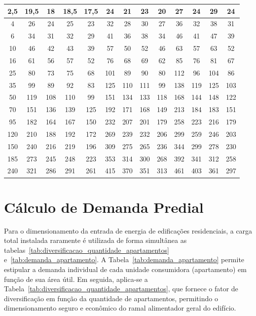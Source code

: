\documentclass[12pt,openright,oneside,a4paper,brazil]{abntex2}
\begin{document}
\begin{table}[H]
\begin{minipage}{\linewidth}
{\begin{tabular}{c | c | c | c |c | c |c | c |c | c |c | c |c}
        2,5 & 19,5 & 18 & 18,5 & 17,5 & 24 & 21 & 23 & 20 & 27 & 24 & 29 & 24 \\ \hline
        4 & 26 & 24 & 25 & 23 & 32 & 28 & 30 & 27 & 36 & 32 & 38 & 31 \\ \hline
        6 & 34 & 31 & 32 & 29 & 41 & 36 & 38 & 34 & 46 & 41 & 47 & 39 \\ \hline
        10 & 46 & 42 & 43 & 39 & 57 & 50 & 52 & 46 & 63 & 57 & 63 & 52 \\ \hline
        16 & 61 & 56 & 57 & 52 & 76 & 68 & 69 & 62 & 85 & 76 & 81 & 67 \\ \hline
        25 & 80 & 73 & 75 & 68 & 101 & 89 & 90 & 80 & 112 & 96 & 104 & 86 \\ \hline
        35 & 99 & 89 & 92 & 83 & 125 & 110 & 111 & 99 & 138 & 119 & 125 & 103 \\ \hline
        50 & 119 & 108 & 110 & 99 & 151 & 134 & 133 & 118 & 168 & 144 & 148 & 122 \\ \hline
        70 & 151 & 136 & 139 & 125 & 192 & 171 & 168 & 149 & 213 & 184 & 183 & 151 \\ \hline
        95 & 182 & 164 & 167 & 150 & 232 & 207 & 201 & 179 & 258 & 223 & 216 & 179 \\ \hline
        120 & 210 & 188 & 192 & 172 & 269 & 239 & 232 & 206 & 299 & 259 & 246 & 203 \\ \hline
        150 & 240 & 216 & 219 & 196 & 309 & 275 & 265 & 236 & 344 & 299 & 278 & 230 \\ \hline
        185 & 273 & 245 & 248 & 223 & 353 & 314 & 300 & 268 & 392 & 341 & 312 & 258 \\ \hline
        240 & 321 & 286 & 291 & 261 & 415 & 370 & 351 & 313 & 461 & 403 & 361 & 297 \\
        \hline
        \end{tabular}%
        }

        \vspace{0.15cm}
    \end{minipage}

\end{table}

\section{Cálculo de Demanda Predial} 

\hspace{1.27cm}Para o dimensionamento da entrada de energia de edificações residenciais, a carga total instalada raramente é utilizada de forma simultânea as tabelas~\ref{tab:diversificacao_quantidade_apartamentos} e~\ref{tab:demanda_apartamento}. A Tabela~\ref{tab:demanda_apartamento} permite estipular a demanda individual de cada unidade consumidora (apartamento) em função de sua área útil. Em seguida, aplica-se a Tabela~\ref{tab:diversificacao_quantidade_apartamentos}, que fornece o fator de diversificação em função da quantidade de apartamentos, permitindo o dimensionamento seguro e econômico do ramal alimentador geral do edifício.
\end{document}
